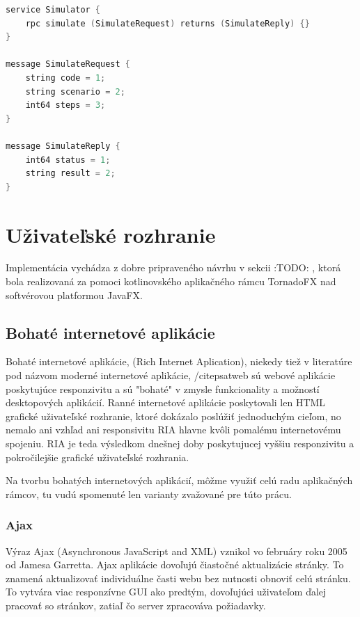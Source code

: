 \begin{lstlisting}[language=C++]
service Simulator {
	rpc simulate (SimulateRequest) returns (SimulateReply) {}
}

message SimulateRequest {
	string code = 1;
	string scenario = 2;
	int64 steps = 3;
}

message SimulateReply {
	int64 status = 1;
	string result = 2;
}
\end{lstlisting}

\section{Uživateľské rozhranie}

Implementácia vychádza z dobre pripraveného návrhu v sekcii :TODO: , ktorá bola realizovaná za pomoci kotlinovského aplikačného rámcu TornadoFX nad softvérovou platformou JavaFX.

\subsection{Bohaté internetové aplikácie}

Bohaté internetové aplikácie, (Rich Internet Aplication), niekedy tiež v literatúre pod názvom moderné internetové aplikácie, /cite{psatweb} sú webové aplikácie poskytujúce responzivitu a sú "bohaté" v zmysle funkcionality a možností desktopových aplikácií. Ranné internetové aplikácie poskytovali len HTML grafické uživateľské rozhranie, ktoré dokázalo poslúžiť jednoduchým cieľom, no nemalo ani vzhľad ani responsivitu RIA hlavne kvôli pomalému internetovému spojeniu. RIA je teda výsledkom dnešnej doby poskytujucej vyššiu responzivitu a pokročilejšie grafické uživateľské rozhrania.
\cite{deitel2008ajax}

Na tvorbu bohatých internetových aplikácií, môžme využiť celú radu aplikačných rámcov, tu vudú spomenuté len varianty zvažované pre túto prácu.

\subsubsection{Ajax}

Výraz Ajax (Asynchronous JavaScript and XML) vznikol vo februáry roku 2005 od Jamesa Garretta. Ajax aplikácie dovoľujú čiastočné aktualizácie stránky. To znamená aktualizovať individuálne časti webu bez nutnosti obnoviť celú stránku. To vytvára viac responzívne GUI ako predtým, dovoľujúci uživateľom ďalej pracovať so stránkov, zatiaľ čo server zpracováva požiadavky. \\

